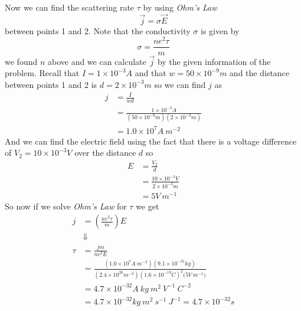 \documentclass[11pt]{article}
\numberwithin{equation}{section}
\begin{document}
Now we can find the scattering rate $\tau$ by using \emph{Ohm's Law} 
$$\vec{j} = \sigma\vec{E}$$
between points 1 and 2. Note that the conductivity $\sigma$ is given by
$$\sigma = \frac{ne^2\tau}{m}$$
we found $n$ above and we can calculate $\vec{j}$ by the given information of the problem. Recall that $I = 1\times10^{-3}\unit{A}$ and that $w = 50\times10^{-9}\unit{m}$ and the distance between points 1 and 2 is $d = 2\times10^{-3}\unit{m}$ so we can find $j$ as
\begin{align*}
j &= \frac{I}{wd}\\
&= \frac{1\times10^{-3}\unit{A}}{(50\times10^{-9}\unit{m})(2\times10^{-3}\unit{m})}\\
&= 1.0\times10^{7}\unit{A\ m^{-2}}
\end{align*}
And we can find the electric field using the fact that there is a voltage difference of $V_2 = 10\times10^{-3}\unit{V}$ over the distance $d$ so
\begin{align*}
E &= \frac{V_2}{d}\\
&= \frac{10\times10^{-3}\unit{V}}{2\times10^{-3}\unit{m}}\\
&= 5\unit{V\ m^{-1}}
\end{align*}
So now if we solve \emph{Ohm's Law} for $\tau$ we get
\begin{align*}
j &= \left(\frac{ne^2\tau}{m}\right) E\\
&\Downarrow\\
\tau &= \frac{jm}{ne^2E}\\
&= \frac{(1.0\times10^{7}\unit{A\ m^{-2}})(9.1\times10^{-31}\unit{kg})}{(2.4\times10^{26}\unit{m^{-3}})(1.6\times10^{-19}\unit{C})^2(5\unit{V\ m^{-1})}}\\
&= 4.7\times10^{-32}\unit{A\ kg\ m^2\ V^{-1}\ C^{-2}}\\ 
&= 4.7\times10^{-32}\unit{kg\ m^{2}\ s^{-1}\ J^{-1}} = 4.7\times10^{-32}\unit{s}
\end{align*}
\end{document}
